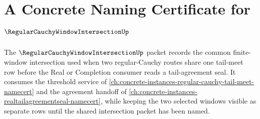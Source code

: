 \chapter{A Concrete Naming Certificate for $\RegularCauchyWindowIntersectionUp$}
\label{ch:concrete-instances-regular-cauchy-window-intersection-namecert}

The $\RegularCauchyWindowIntersectionUp$ packet records the common finite-window intersection used when two regular-Cauchy routes share one tail-meet row before the Real or Completion consumer reads a tail-agreement seal. It consumes the threshold service of \autoref{ch:concrete-instances-regular-cauchy-tail-meet-namecert} and the agreement handoff of \autoref{ch:concrete-instances-realtailagreementseal-namecert}, while keeping the two selected windows visible as separate rows until the shared intersection packet has been named.

